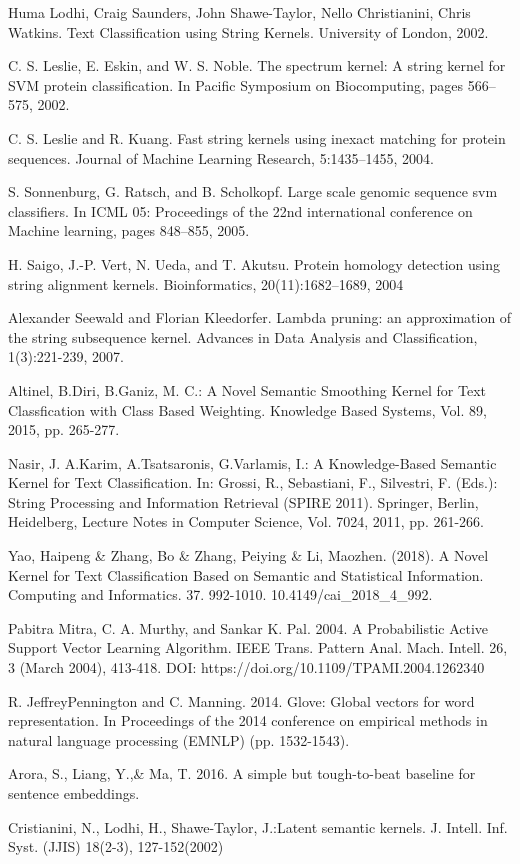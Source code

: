 \documentclass{article}
\begin{document}
\newpage
\begin{thebibliography}{8}

Huma Lodhi, Craig Saunders, John Shawe-Taylor, Nello Christianini, Chris Watkins. Text Classification using String Kernels. University of London, 2002.

C. S. Leslie, E. Eskin, and W. S. Noble. The spectrum kernel: A string kernel for SVM protein classification. In Pacific Symposium on Biocomputing, pages 566–575, 2002.

C. S. Leslie and R. Kuang. Fast string kernels using inexact matching for protein sequences. Journal of Machine Learning Research, 5:1435–1455, 2004.

S. Sonnenburg, G. Ratsch, and B. Scholkopf. Large scale genomic sequence svm classifiers. In ICML 05: Proceedings of the 22nd international conference on Machine learning, pages 848–855, 2005.

H. Saigo, J.-P. Vert, N. Ueda, and T. Akutsu. Protein homology detection using string alignment kernels. Bioinformatics, 20(11):1682–1689, 2004

Alexander Seewald and Florian Kleedorfer. Lambda pruning: an approximation of the string subsequence kernel. Advances in Data Analysis and Classification, 1(3):221-239, 2007.

Altinel, B.Diri, B.Ganiz, M. C.: A Novel Semantic Smoothing Kernel for Text Classfication with Class Based Weighting. Knowledge Based Systems, Vol. 89, 2015, pp. 265-277.

Nasir, J. A.Karim, A.Tsatsaronis, G.Varlamis, I.: A Knowledge-Based
Semantic Kernel for Text Classification. In: Grossi, R., Sebastiani, F., Silvestri, F. (Eds.): String Processing and Information Retrieval (SPIRE 2011). Springer, Berlin, Heidelberg, Lecture Notes in Computer Science, Vol. 7024, 2011, pp. 261-266.

Yao, Haipeng \& Zhang, Bo \& Zhang, Peiying \& Li, Maozhen. (2018). A Novel Kernel for Text Classification Based on Semantic and Statistical Information. Computing and Informatics. 37. 992-1010. 10.4149/cai\_2018\_4\_992.

Pabitra Mitra, C. A. Murthy, and Sankar K. Pal. 2004. A Probabilistic Active Support Vector Learning Algorithm. IEEE Trans. Pattern Anal. Mach. Intell. 26, 3 (March 2004), 413-418. DOI: https://doi.org/10.1109/TPAMI.2004.1262340

R. JeffreyPennington and C. Manning. 2014. Glove: Global vectors for word representation. In Proceedings of the 2014 conference on empirical methods in natural language processing (EMNLP) (pp. 1532-1543).

Arora, S., Liang, Y.,\& Ma, T. 2016. A simple but tough-to-beat baseline for sentence embeddings.

Cristianini, N., Lodhi, H., Shawe-Taylor, J.:Latent semantic kernels. J. Intell. Inf. Syst. (JJIS) 18(2-3), 127-152(2002)
\end{thebibliography}
\end{document}
